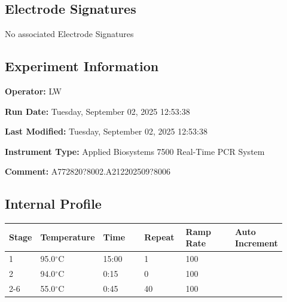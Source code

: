 \documentclass[UTF8,10pt,a4paper,fontset=fandol]{ctexart}
\newcommand{\fieldvalue}[1]{#1}
\begin{document}
\subsection*{Electrode Signatures}

No associated Electrode Signatures

\subsection*{Experiment Information}

\textbf{Operator:}
\fieldvalue{LW}

\textbf{Run Date:}
\fieldvalue{Tuesday, September 02, 2025 12:53:38}

\textbf{Last Modified:}
\fieldvalue{Tuesday, September 02, 2025 12:53:38}

\textbf{Instrument Type:}
\fieldvalue{Applied Biosystems 7500 Real-Time PCR System}

\textbf{Comment:}
\fieldvalue{A772820?8002.A212202509?8006}

\subsection*{Internal Profile}

\begin{tabular}{|p{0.10\linewidth}|p{0.18\linewidth}|p{0.15\linewidth}|p{0.15\linewidth}|p{0.18\linewidth}|p{0.16\linewidth}|}
\hline
\textbf{Stage} & \textbf{Temperature} & \textbf{Time} & \textbf{Repeat} & \textbf{Ramp Rate} & \textbf{Auto Increment} \\
\hline
\fieldvalue{1}
&
\fieldvalue{95.0$^\circ$C}
&
\fieldvalue{15:00}
&
\fieldvalue{1}
&
\fieldvalue{100}
&
\\
\hline
\fieldvalue{2}
&
\fieldvalue{94.0$^\circ$C}
&
\fieldvalue{0:15}
&
\fieldvalue{0}
&
\fieldvalue{100}
&
\\
\cline{2-6}
&
\fieldvalue{55.0$^\circ$C}
&
\fieldvalue{0:45}
&
\fieldvalue{40}
&
\fieldvalue{100}
&
\\
\hline
\end{tabular}
\end{document}
